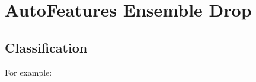 \documentclass[letterpaper,11pt,english]{sphinxmanual}
\begin{document}
\begin{figure}[htbp]
\centering

\noindent{}
\end{figure}

\begin{figure}[htbp]
\centering

\noindent{}
\end{figure}


\section{AutoFeatures  Ensemble Drop}
\label{\detokenize{demo:autofeatures-ensemble-drop}}

\subsection{Classification}
\label{\detokenize{demo:classification}}
For example:
\end{document}
